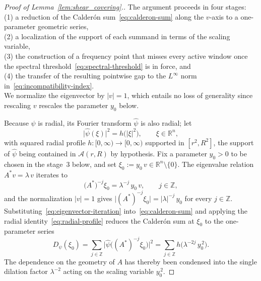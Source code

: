 \documentclass[pdflatex,sn-basic,Numbered]{sn-jnl}
\theoremstyle{thmstyleone}%
\theoremstyle{thmstylethree}%
\begin{document}
\begin{proof}[Proof of Lemma~\ref{lem:shear_covering}.]
	The argument proceeds in four stages:\\
	(1) a reduction of the Calder\'on
	sum~\eqref{eq:calderon-sum} along the $v$-axis to a one-parameter geometric
	series,\\
	(2) a localization of the support of each summand in terms of the
	scaling variable,\\
	(3) the construction of a frequency point that misses every
	active window once the spectral threshold~\eqref{eq:spectral-threshold} is
	in force, and\\
	(4) the transfer of the resulting pointwise gap to the
	$L^\infty$ norm in~\eqref{eq:incompatibility-index}.\\
	We normalize the
	eigenvector by $|v| = 1$, which entails no loss of generality since
	rescaling $v$ rescales the parameter $y_0$ below.
	
	Because $\psi$ is radial, its Fourier transform $\widehat{\psi}$ is also
	radial; let
	\begin{equation}\label{eq:radial-profile}
		\bigl|\widehat{\psi}(\xi)\bigr|^{2} =h\!\bigl(|\xi|^{2} \bigr),
		\qquad\xi\in\mathbb{R}^n,
	\end{equation}
	with squared radial profile $h \colon [0,\infty)\to [0,\infty)$ supported
	in $[r^{2}, R^{2}]$, the support of $\widehat{\psi}$ being contained in
	$\mathcal{A}(r, R)$ by hypothesis.
	Fix a parameter $y_0 > 0$ to be chosen in the stage~3 below, and set
	$\xi_{0}:= y_0\, v \in \mathbb{R}^n \setminus \{0\}$. The eigenvalue
	relation $A^{*} v =\lambda\, v$ iterates to
	\begin{equation}\label{eq:eigenvector-iteration}
		\bigl( A^{*} \bigr)^{-j} \xi_{0}
		 =\lambda^{-j}\, y_0\, v,
		\qquad j \in \mathbb{Z},
	\end{equation}
	and the normalization $|v| = 1$ gives
	$\bigl|(A^{*})^{-j} \xi_{0}\bigr| = |\lambda|^{-j}\, y_0$ for every
	$j \in \mathbb{Z}$. Substituting~\eqref{eq:eigenvector-iteration}
	into~\eqref{eq:calderon-sum} and applying the radial
	identity~\eqref{eq:radial-profile} reduces the Calder\'on sum at $\xi_{0}$
	to the one-parameter series
	\begin{equation}\label{eq:radial-cs}
		D_{\psi}(\xi_{0})
		 =  \sum_{j \in \mathbb{Z}}
		\bigl| \widehat{\psi}\bigl( (A^{*})^{-j} \xi_{0} \bigr) \bigr|^{2}
		 =  \sum_{j \in \mathbb{Z}} h\!\bigl( \lambda^{-2 j}\, y_{0}^{\,2} \bigr) .
	\end{equation}
	The dependence on the geometry of $A$ has thereby been condensed into the
	single dilation factor $\lambda^{-2}$ acting on the scaling variable
	$y_{0}^{\,2}$.
	

\end{proof}
\end{document}
